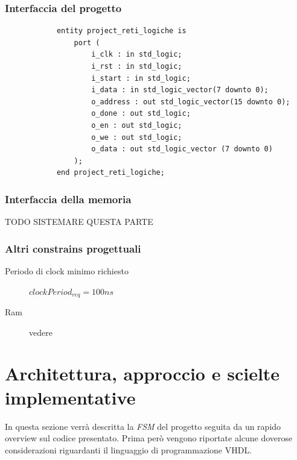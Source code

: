 \documentclass[11pt,a4paper]{article}
\begin{document}
        \subsubsection{Interfaccia del progetto}
            \begin{verbatim}
            entity project_reti_logiche is
                port (
                    i_clk : in std_logic;
                    i_rst : in std_logic;
                    i_start : in std_logic;
                    i_data : in std_logic_vector(7 downto 0);
                    o_address : out std_logic_vector(15 downto 0);
                    o_done : out std_logic;
                    o_en : out std_logic;
                    o_we : out std_logic;
                    o_data : out std_logic_vector (7 downto 0)
                );
            end project_reti_logiche;
            \end{verbatim}
        \subsubsection{Interfaccia della memoria}
        TODO SISTEMARE QUESTA PARTE
        \subsubsection{Altri constrains progettuali}
        \begin{description}
            \item[Periodo di clock minimo richiesto] $clockPeriod_{req} = 100ns$
            \item[Ram] vedere   
        \end{description}
    \section{Architettura, approccio e scielte implementative}
        In questa sezione verrà descritta la \textit{FSM} del progetto seguita da un rapido overview sul codice presentato. Prima però vengono riportate alcune doverose considerazioni
        riguardanti il linguaggio di programmazione VHDL.
\end{document}
